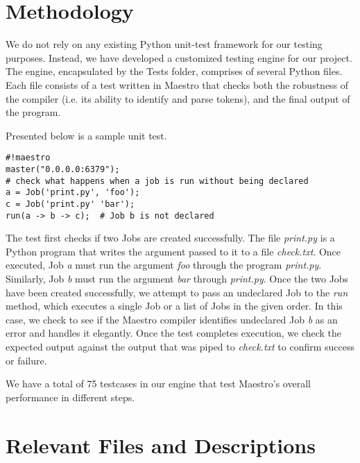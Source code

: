 \section{Methodology}
We do not rely on any existing Python unit-test framework for our testing purposes. Instead, we have developed a customized testing engine for our project. The engine, encapsulated by the Tests folder, comprises of several Python files. Each file consists of a test written in Maestro that checks both the robustness of the compiler (i.e. its ability to identify and parse tokens), and the final output of the program. 

Presented below is a sample unit test.

\begin{center}
\begin{verbatim}
#!maestro
master("0.0.0.0:6379");
# check what happens when a job is run without being declared
a = Job('print.py', 'foo');
c = Job('print.py' 'bar');
run(a -> b -> c);  # Job b is not declared
\end{verbatim}
\end{center}

The test first checks if two Jobs are created successfully. The file \textit{print.py} is a Python program that writes the argument passed to it to a file \textit{check.txt}. Once executed, Job \textit{a} must run the argument \textit{foo} through the program \textit{print.py}. Similarly, Job \textit{b} must run the argument \textit{bar} through \textit{print.py}. 
Once the two Jobs have been created successfully, we attempt to pass an undeclared Job to the \textit{run} method, which executes a single Job or a list of Jobs in the given order. In this case, we check to see if the Maestro compiler identifies undeclared Job \textit{b} as an error and handles it elegantly. Once the test completes execution, we check the expected output against the output that was piped to \textit{check.txt} to confirm success or failure. 

We have a total of 75 testcases in our engine that test Maestro's  overall performance in different steps.

\section{Relevant Files and Descriptions}

